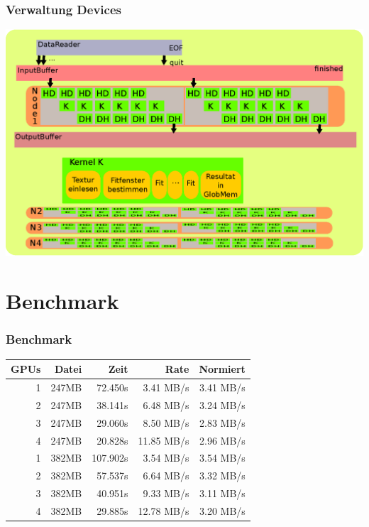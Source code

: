 \documentclass[ddcfooter]{tudbeamer}
\begin{document}
\begin{frame}
    \frametitle*{Verwaltung Devices}
    \begin{center}
    \includegraphics[width=\textwidth,height=0.7\textheight,keepaspectratio]{Threadchart.eps}
    \end{center}
\end{frame}


\section{Benchmark}
\begin{frame}
    \frametitle*{Benchmark}
    \begin{center}
    \begin{tabular}{|r|r|r|r|r|}
    \hline
	GPUs & Datei    & Zeit     & Rate       & Normiert  \\
	\hline
	1    & 247MB	& 72.450s  &  3.41 MB/s & 3.41 MB/s \\
	2	 & 247MB	& 38.141s  &  6.48 MB/s & 3.24 MB/s \\
	3	 & 247MB	& 29.060s  &  8.50 MB/s & 2.83 MB/s \\
	4	 & 247MB	& 20.828s  & 11.85 MB/s & 2.96 MB/s \\
	1	 & 382MB	& 107.902s &  3.54 MB/s & 3.54 MB/s \\
	2	 & 382MB	& 57.537s  &  6.64 MB/s & 3.32 MB/s \\
	3	 & 382MB	& 40.951s  &  9.33 MB/s & 3.11 MB/s \\
	4	 & 382MB	& 29.885s  & 12.78 MB/s & 3.20 MB/s \\
	\hline
	\end{tabular}
	\end{center}
\end{frame}
\end{document}
